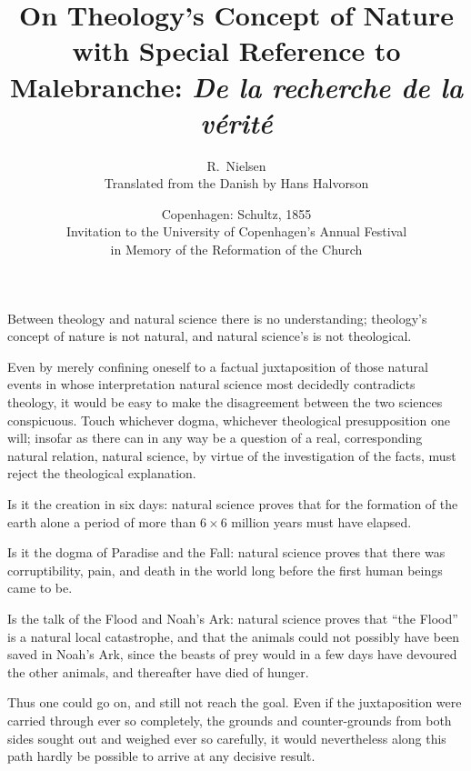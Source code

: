 \documentclass[12pt,a4paper]{article}
\title{\textbf{On Theology's Concept of Nature}\\[4pt]
       \large with Special Reference to\\[4pt]
       \large Malebranche: \emph{De la recherche de la vérité}}
\author{R.\ Nielsen\\[4pt]
  \small Translated from the Danish by Hans Halvorson}
\date{Copenhagen: Schultz, 1855\\[4pt]
  \small Invitation to the University of Copenhagen's Annual Festival\\
  \small in Memory of the Reformation of the Church}
\begin{document}
\maketitle
\thispagestyle{fancy}

\bigskip


\noindent
Between theology and natural science there is no understanding; theology's
concept of nature is not natural, and natural science's is not theological.

Even by merely confining oneself to a factual juxtaposition of those natural
events in whose interpretation natural science most decidedly contradicts
theology, it would be easy to make the disagreement between the two sciences
conspicuous. Touch whichever dogma, whichever theological presupposition one
will; insofar as there can in any way be a question of a real, corresponding
natural relation, natural science, by virtue of the investigation of the facts,
must reject the theological explanation.

Is it the creation in six days: natural science proves that for the formation of
the earth alone a period of more than $6 \times 6$ million years must have
elapsed.

Is it the dogma of Paradise and the Fall: natural science proves that there was
corruptibility, pain, and death in the world long before the first human beings
came to be.

Is the talk of the Flood and Noah's Ark: natural science proves that ``the
Flood'' is a natural local catastrophe, and that the animals could not possibly
have been saved in Noah's Ark, since the beasts of prey would in a few days have
devoured the other animals, and thereafter have died of hunger.

Thus one could go on, and still not reach the goal. Even if the juxtaposition
were carried through ever so completely, the grounds and counter-grounds from
both sides sought out and weighed ever so carefully, it would nevertheless along
this path hardly be possible to arrive at any decisive result.
\end{document}
